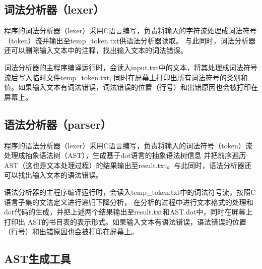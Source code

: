 \documentclass[supercite]{Experimental_Report}
\theoremstyle{definition}
\begin{document}
\subsection{词法分析器（lexer）}
程序的词法分析器（lexer）采用C语言编写，负责将输入的字符流处理成词法符号（token）流并输出至temp\_token.txt供语法分析器读取。
与此同时，词法分析器还可以删除输入文本中的注释，找出输入文本的词法错误。

词法分析器的主程序编译运行时，会读入input.txt中的文本，将其处理成词法符号流后写入临时文件temp\_token.txt,
同时在屏幕上打印出所有词法符号的类别和值。如果输入文本有词法错误，词法错误的位置（行号）和出错原因也会被打印在屏幕上。

\subsection{语法分析器（parser）}
程序的语法分析器（lexer）采用C语言编写，负责将输入的词法符号（token）流处理成抽象语法树（AST），生成基于dot语言的抽象语法树信息
并把前序遍历AST（这也是文本处理过程）的结果输出至result.txt。与此同时，语法分析器还可以找出输入文本的语法错误。

语法分析器的主程序编译运行时，会读入temp\_token.txt中的词法符号流，按照C语言子集的文法定义进行递归下降分析，
在分析的过程中进行文本格式的处理和dot代码的生成，并把上述两个结果输出至result.txt和AST.dot中，同时在屏幕上打印出
AST的书目表的表示形式。如果输入文本有语法错误，语法错误的位置（行号）和出错原因也会被打印在屏幕上。

\subsection{AST生成工具}
\end{document}
